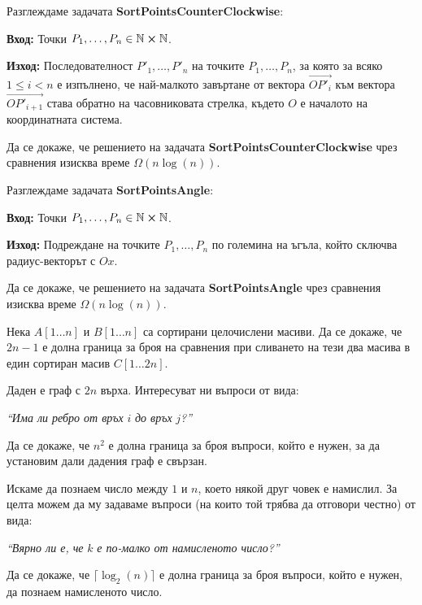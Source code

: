 \begin{problem}
Разглеждаме задачата \textbf{SortPointsCounterClockwise}:

\vspace*{2mm}
\textbf{Вход:} Точки $P_1, \dots, P_n \in \mathbb{N} \cross \mathbb{N}$.

\textbf{Изход:} Последователност $P'_1, \dots, P'_n$ на точките $P_1, \dots, P_n$, за която за всяко $1 \leq i < n$ е изпълнено, че най-малкото завъртане от вектора $\overrightarrow{OP'_i}$ към вектора $\overrightarrow{OP'_{i + 1}}$ става обратно на часовниковата стрелка, където $O$ е началото на координатната система.
\vspace*{2mm}

Да се докаже, че решението на задачата \textbf{SortPointsCounterClockwise} чрез сравнения изисква време $\Omega(n \log(n))$.
\end{problem}

\newpage

\begin{problem}
Разглеждаме задачата \textbf{SortPointsAngle}:

\vspace*{2mm}
\textbf{Вход:} Точки $P_1, \dots, P_n \in \mathbb{N} \cross \mathbb{N}$.

\textbf{Изход:} Подреждане на точките $P_1, \dots, P_n$ по големина на ъгъла, който сключва радиус-векторът с $Ox$.
\vspace*{2mm}

Да се докаже, че решението на задачата \textbf{SortPointsAngle} чрез сравнения изисква време $\Omega(n \log(n))$.
\end{problem}

\begin{problem}
Нека $A[1 \dots n]$ и $B[1 \dots n]$ са сортирани целочислени масиви.
Да се докаже, че $2n - 1$ е долна граница за броя на сравнения при сливането на тези два масива в един сортиран масив $C[1 \dots 2n]$.
\end{problem}

\begin{problem}
Даден е граф с $2n$ върха.
Интересуват ни въпроси от вида:
\begin{center}
    \textit{``Има ли ребро от връх} $i$ \textit{до връх} $j$\textit{?''}
\end{center}
Да се докаже, че $n^2$ е долна граница за броя въпроси, който е нужен, за да установим дали дадения граф е свързан.
\end{problem}

\begin{problem}
Искаме да познаем число между $1$ и $n$, което някой друг човек е намислил.
За целта можем да му задаваме въпроси (на които той трябва да отговори честно) от вида:
\begin{center}
    \textit{``Вярно ли е, че} $k$ \textit{е по-малко от намисленото число?''}
\end{center}
Да се докаже, че $\lceil \log_2(n) \rceil$ е долна граница за броя въпроси, който е нужен, да познаем намисленото число.
\end{problem}

